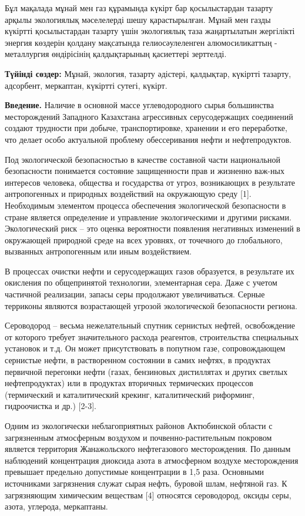 Бұл мақалада мұнай мен газ құрамында күкірт бар қосылыстардан тазарту
арқылы экологиялық мәселелерді шешу қарастырылған. Мұнай мен газды
күкіртті қосылыстардан тазарту үшін экологиялық таза жаңартылатын
жергілікті энергия көздерін қолдану мақсатында гелиосәулеленген
алюмосиликаттың - металлургия өндірісінің қалдықтарының қасиеттері
зерттелді.

{\bfseries Түйінді сөздер:} Мұнай, экология, тазарту әдістері, қалдықтар,
күкіртті тазарту, адсорбент, меркаптан, күкіртті сутегі, күкірт.

\begin{multicols}{2}
{\bfseries Введение.} Наличие в основной массе углеводородного сырья
большинства месторождений Западного Казахстана агрессивных
серусодержащих соединений создают трудности при добыче, транспортировке,
хранении и его переработке, что делает особо актуальной проблему
обессеривания нефти и нефтепродуктов.

Под экологической безопасностью в качестве составной части национальной
безопасности понимается состояние защищенности прав и жизненно важ-ных
интересов человека, общества и государства от угроз, возникающих в
результате антропогенных и природных воздействий на окружающую среду
{[}1{]}. Необходимым элементом процесса обеспечения экологической
безопасности в стране является определение и управление экологическими и
другими рисками. Экологический риск -- это оценка вероятности появления
негативных изменений в окружающей природной среде на всех уровнях, от
точечного до глобального, вызванных антропогенным или иным воздействием.

В процессах очистки нефти и серусодержащих газов образуется, в
результате их окисления по общепринятой технологии, элементарная сера.
Даже с учетом частичной реализации, запасы серы продолжают
увеличиваться. Серные терриконы являются возрастающей угрозой
экологической безопасности региона.

Сероводород -- весьма нежелательный спутник сернистых нефтей,
освобождение от которого требует значительного расхода реагентов,
строительства специальных установок и т.д. Он может присутствовать в
попутном газе, сопровождающем сернистые нефти, в растворенном состоянии
в самих нефтях, в продуктах первичной перегонки нефти (газах, бензиновых
дистиллятах и других светлых нефтепродуктах) или в продуктах вторичных
термических процессов (термический и каталитический крекинг,
каталитический риформинг, гидроочистка и др.) {[}2-3{]}.

Одним из экологически неблагоприятных районов Актюбинской области с
загрязненным атмосферным воздухом и почвенно-растительным покровом
является территория Жанажольского нефтегазового месторождения. По данным
наблюдений концентрация диоксида азота в атмосферном воздухе
месторождения превышает предельно допустимые концентрации в 1,5 раза.
Основными источниками загрязнения служат сырая нефть, буровой шлам,
нефтяной газ. К загрязняющим химическим веществам {[}4{]} относятся
сероводород, оксиды серы, азота, углерода, меркаптаны.


\end{multicols}
